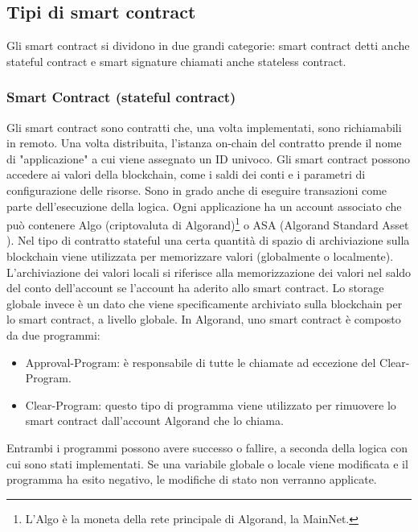 \subsection{Tipi di smart contract}
Gli smart contract si dividono in due grandi categorie: smart contract detti anche stateful contract e smart signature chiamati anche stateless contract.

\subsubsection{Smart Contract (stateful contract)}
 Gli smart contract sono contratti che, una volta implementati, sono richiamabili in remoto. Una volta distribuita, l'istanza on-chain del contratto prende il nome di "applicazione" a cui viene assegnato un ID univoco. Gli smart contract possono accedere ai valori della blockchain, come i saldi dei conti e i parametri di configurazione delle risorse. Sono in grado anche di eseguire transazioni come parte dell'esecuzione della logica. Ogni applicazione ha un account associato che può contenere Algo (criptovaluta di Algorand)\footnote{L'Algo è la moneta  della rete principale di Algorand, la MainNet.} o ASA (Algorand Standard Asset \cite{asa}). Nel tipo di contratto stateful una certa quantità di spazio di archiviazione sulla blockchain viene utilizzata per memorizzare valori (globalmente o localmente). L'archiviazione dei valori locali si riferisce alla memorizzazione dei valori nel saldo del conto dell'account se l'account ha aderito allo smart contract. Lo storage globale invece è un dato che viene specificamente archiviato sulla blockchain per lo smart contract, a livello globale. In Algorand, uno smart contract è composto da due programmi:
 \begin{itemize}
 \item Approval-Program: è responsabile di tutte le chiamate ad eccezione del Clear-Program.
 \item Clear-Program: questo tipo di programma viene utilizzato per rimuovere lo smart contract dall'account Algorand che lo chiama.
 \end{itemize}
 Entrambi i programmi possono avere successo o fallire, a seconda della logica con cui sono stati implementati. Se una variabile globale o locale viene modificata e il programma ha esito negativo, le modifiche di stato non verranno applicate.
 

